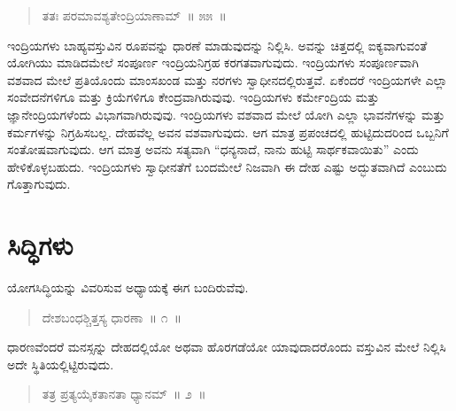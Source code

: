 \vspace{-0.2cm}

\begin{verse}
ತತಃ ಪರಮಾವಶ್ಯತೇಂದ್ರಿಯಾಣಾಮ್​~॥ ೫೫~॥
\end{verse}

\vspace{-0.4cm}


\vspace{0.2cm}

ಇಂದ್ರಿಯಗಳು ಬಾಹ್ಯವಸ್ತುವಿನ ರೂಪವನ್ನು ಧಾರಣೆ ಮಾಡುವುದನ್ನು ನಿಲ್ಲಿಸಿ. ಅವನ್ನು ಚಿತ್ತದಲ್ಲಿ ಐಕ್ಯವಾಗುವಂತೆ ಯೋಗಿಯು ಮಾಡಿದಮೇಲೆ ಸಂಪೂರ್ಣ ಇಂದ್ರಿಯನಿಗ್ರಹ ಕರಗತವಾಗುವುದು. ಇಂದ್ರಿಯಗಳು ಸಂಪೂರ್ಣವಾಗಿ ವಶವಾದ ಮೇಲೆ ಪ್ರತಿಯೊಂದು ಮಾಂಸಖಂಡ ಮತ್ತು ನರಗಳು ಸ್ವಾಧೀನದಲ್ಲಿರುತ್ತವೆ. ಏಕೆಂದರೆ ಇಂದ್ರಿಯಗಳೇ ಎಲ್ಲಾ ಸಂವೇದನೆಗಳಿಗೂ ಮತ್ತು ಕ್ರಿಯೆಗಳಿಗೂ ಕೇಂದ್ರವಾಗಿರುವುವು. ಇಂದ್ರಿಯಗಳು ಕರ್ಮೇಂದ್ರಿಯ ಮತ್ತು ಜ್ಞಾನೇಂದ್ರಿಯಗಳೆಂದು ವಿಭಾಗವಾಗಿರುವುವು. ಇಂದ್ರಿಯಗಳು ವಶವಾದ ಮೇಲೆ ಯೋಗಿ ಎಲ್ಲಾ ಭಾವನೆಗಳನ್ನು ಮತ್ತು ಕರ್ಮಗಳನ್ನು ನಿಗ್ರಹಿಸಬಲ್ಲ. ದೇಹವೆಲ್ಲ ಅವನ ವಶವಾಗುವುದು. ಆಗ ಮಾತ್ರ ಪ್ರಪಂಚದಲ್ಲಿ ಹುಟ್ಟಿದುದರಿಂದ ಒಬ್ಬನಿಗೆ ಸಂತೋಷವಾಗುವುದು. ಆಗ ಮಾತ್ರ ಅವನು ಸತ್ಯವಾಗಿ “ಧನ್ಯನಾದೆ, ನಾನು ಹುಟ್ಟಿ ಸಾರ್ಥಕವಾಯಿತು” ಎಂದು ಹೇಳಿಕೊಳ್ಳಬಹುದು. ಇಂದ್ರಿಯಗಳು ಸ್ವಾಧೀನತೆಗೆ ಬಂದಮೇಲೆ ನಿಜವಾಗಿ ಈ ದೇಹ ಎಷ್ಟು ಅದ್ಭುತವಾಗಿದೆ ಎಂಬುದು ಗೊತ್ತಾಗುವುದು.

\chapter{ಸಿದ್ಧಿಗಳು}%

ಯೋಗಸಿದ್ಧಿಯನ್ನು ವಿವರಿಸುವ ಅಧ್ಯಾಯಕ್ಕೆ ಈಗ ಬಂದಿರುವೆವು. 

\vspace{-0.2cm}

\begin{verse}
ದೇಶಬಂಧಶ್ಚಿತ್ತಸ್ಯ ಧಾರಣಾ~॥ ೧~॥
\end{verse}

\vspace{-0.35cm}


\vspace{0.2cm}

ಧಾರಣವೆಂದರೆ ಮನಸ್ಸನ್ನು ದೇಹದಲ್ಲಿಯೋ ಅಥವಾ ಹೊರಗಡೆಯೋ ಯಾವುದಾದರೊಂದು ವಸ್ತುವಿನ ಮೇಲೆ ನಿಲ್ಲಿಸಿ ಅದೇ ಸ್ಥಿತಿಯಲ್ಲಿಟ್ಟಿರುವುದು. 

\vspace{-0.2cm}

\begin{verse}
ತತ್ರ ಪ್ರತ್ಯಯೈಕತಾನತಾ ಧ್ಯಾನಮ್​~॥ ೨~॥
\end{verse}

